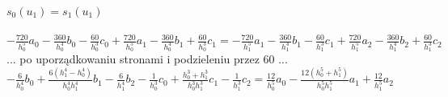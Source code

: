 \documentclass[a4paper,11pt]{article}
\begin{document}
    $s_0(u_1) = s_1(u_1)$ \\ \\
    $- \frac{720}{h_0^5} a_0  - \frac{360}{h_0^4} b_0 - \frac{60}{h_0^3} c_0
        + \frac{720}{h_0^5} a_{1} - \frac{360}{h_0^4} b_{1} + \frac{60}{h_0^3} c_{1} =
- \frac{720}{h_1^5} a_1  - \frac{360}{h_1^4} b_1 - \frac{60}{h_1^3} c_1
    + \frac{720}{h_1^5} a_{2} - \frac{360}{h_1^4} b_{2} + \frac{60}{h_1^3} c_{2} $ \\

    ... po uporządkowaniu stronami i podzieleniu przez $60$ ... \\

    $- \frac{6}{h_0^4}b_0 + \frac{6 ( h_1^4 - h_0^4 ) }{h_0^4 h_1^4}b_1 - \frac{6}{h_1^4}b_2
     - \frac{1}{h_0^3}c_0 + \frac{h_0^3 + h_1^3}{h_0^3 h_1^3}c_1 - \frac{1}{h_1^3}c_2  =
       \frac{12}{h_0^5}a_0 - \frac{12(h_0^5 + h_1^5)}{h_0^5 h_1^5}a_1 + \frac{12}{h_1^5}a_2   $
\end{document}
